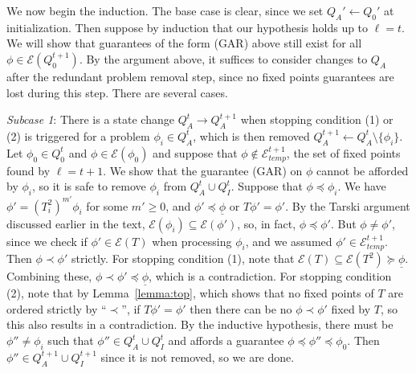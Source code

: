 \documentclass[11pt,reqno]{amsart}
\theoremstyle{definition}
\numberwithin{equation}{section}
\newcommand{\ul}{\underline}
\newcommand{\pre}{\phi}
\newcommand{\sub}{\subseteq}
\newcommand{\fix}{\mathcal{E}}
\newcommand{\peq}{\preceq}
\newcommand{\pe}{\prec}
\newcommand{\bopre}{\ul{\pre}}
\newcommand{\acto}{Q_0}
\newcommand{\actot}{Q_0^t}
\newcommand{\actott}{Q_0^{t+1}}
\newcommand{\acta}{Q_A}
\newcommand{\actat}{Q_A^t}
\newcommand{\actatt}{Q_A^{t + 1}}
\newcommand{\actct}{Q_I^t}
\newcommand{\actctt}{Q_I^{t + 1}}
\newcommand{\pren}{\pre_{0}}
\newcommand{\fixtemptt}{\mathcal{E}^{t + 1}_{temp}}
\begin{document}
We now begin the induction.
The base case is clear, since we set $\acta' \leftarrow \acto'$ at initialization.
Then suppose by induction that our hypothesis holds up to $\ell = t$.
We will show that guarantees of the form (GAR) above still exist for all $\pre \in \fix(\actott)$.
By the argument above, it suffices to consider changes to $\acta$ after the redundant problem removal step, since no fixed points guarantees are lost during this step.
There are several cases.

\emph{Subcase 1}: There is a state change $\actat \to \actatt$ when stopping condition (1) or (2) is triggered for a problem $\pre_i \in \actat$, which is then removed $\actatt \leftarrow \actat \setminus \{\pre_i\}$.
Let $\pren \in \actot$ and $\pre \in \fix(\pren)$ and suppose that $\pre \not \in \fixtemptt$, the set of fixed points found by $\ell = t + 1$.
We show that the guarantee (GAR) on $\pre$ cannot be afforded by $\pre_i$, so it is safe to remove $\pre_i$ from $\actat \cup \actct$.
Suppose that $\pre \peq \pre_i$.
We have $\pre' = (T_i^2)^{m'} \pre_i$ for some $m' \geq 0$, and $\pre' \peq \bopre$ or $T \pre' = \pre'$.
By the Tarski argument discussed earlier in the text, $\fix(\pre_i) \sub \fix(\pre')$, so, in fact, $\pre \peq \pre'$.
But $\pre \not = \pre'$, since we check if $\pre' \in \fix(T)$ when processing $\pre_i$, and we assumed $\pre' \in \fixtemptt$.
Then $\pre \pe \pre'$ strictly.
For stopping condition (1), note that $\fix(T) \sub \fix(T^2) \succeq \bopre$.
Combining these, $\pre \pe \pre' \peq \bopre$, which is a contradiction.
For stopping condition (2), note that by Lemma~\ref{lemma:top}, which shows that no fixed points of $T$ are ordered strictly by ``$\pe$'', if $T\pre' = \pre'$ then there can be no $\pre \pe \pre'$ fixed by $T$, so this also results in a contradiction. 
By the inductive hypothesis, there must be $\pre'' \not = \pre_i$ such that $\pre'' \in \actat \cup \actct$ and affords a guarantee $\pre \peq \pre'' \peq \pren$.
Then $\pre'' \in \actatt \cup \actctt$ since it is not removed, so we are done.
\end{document}
